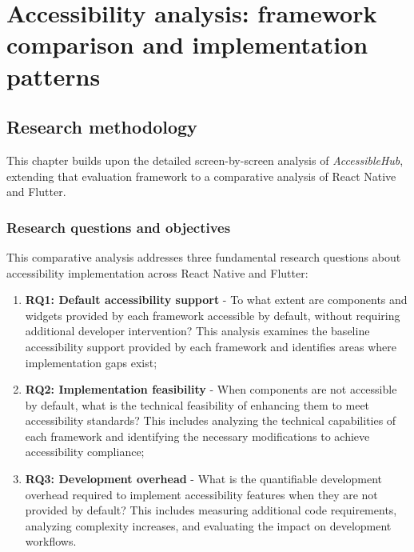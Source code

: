 \chapter{Accessibility analysis: framework comparison and implementation patterns} 
\label{chap:accessibility-implementation}

\section{Research methodology}
This chapter builds upon the detailed screen-by-screen analysis of \textit{AccessibleHub}, extending that evaluation framework to a comparative analysis of React Native and Flutter. 

\subsection{Research questions and objectives}

This comparative analysis addresses three fundamental research questions about accessibility implementation across React Native and Flutter:

\begin{enumerate}
    \item \textbf{RQ1: Default accessibility support} - To what extent are components and widgets provided by each framework accessible by default, without requiring additional developer intervention? This analysis examines the baseline accessibility support provided by each framework and identifies areas where implementation gaps exist;
    
    \item \textbf{RQ2: Implementation feasibility} - When components are not accessible by default, what is the technical feasibility of enhancing them to meet accessibility standards? This includes analyzing the technical capabilities of each framework and identifying the necessary modifications to achieve accessibility compliance;
    
    \item \textbf{RQ3: Development overhead} - What is the quantifiable development overhead required to implement accessibility features when they are not provided by default? This includes measuring additional code requirements, analyzing complexity increases, and evaluating the impact on development workflows.
\end{enumerate}

